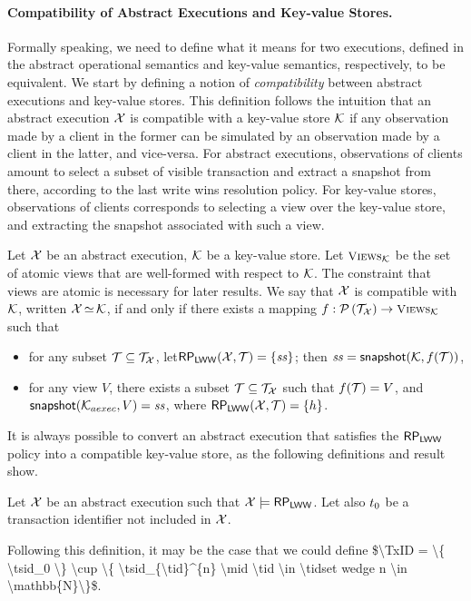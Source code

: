 \paragraph{Compatibility of Abstract Executions and Key-value Stores.}
Formally speaking, we need to define what it means for two executions, defined in the abstract operational semantics and key-value semantics, respectively, 
to be equivalent. We start by defining a notion of \emph{compatibility} between abstract executions and key-value stores. 
This definition follows the intuition that an abstract execution $\mathcal{X}$ is compatible with a key-value store $\mathcal{K}$ if 
any observation made by a client in the former can be simulated by an observation made by a client in the latter, and vice-versa. 
For abstract executions, observations of clients amount to select a subset of visible transaction and extract 
a snapshot from there, according to the last write wins resolution policy. For key-value stores, 
observations of clients corresponds to selecting a view over the key-value store, and extracting the snapshot 
associated with such a view.

\begin{definition}
Let $\mathcal{X}$ be an abstract execution, $\mathcal{K}$ be a key-value store. 
Let $\Views_{\hh}$ be the set of atomic views that are well-formed with 
respect to $\mathcal{K}$.
\ac{The constraint that views are atomic is necessary for later results.}
We say that $\mathcal{X}$ is compatible with $\mathcal{K}$, written 
$\mathcal{X} \mathop{\simeq} \mathcal{K}$, if and only if there exists a  mapping 
$f: \powerset{\T_{\aexec}} \rightarrow \Views_{\hh}$
such that  
\begin{itemize}
\item for any subset $\mathcal{T} \subseteq \mathcal{T}_{\mathcal{X}}$, let$\mathsf{RP}_{\mathsf{LWW}}(\mathcal{X}, \mathcal{T}) = \{\mathit{ss}\}$; 
then $\mathit{ss} = \mathsf{snapshot}(\mathcal{K}, f(\mathcal{T}))$, 
\item for any view $V$, there exists a subset $\mathcal{T} \subseteq \mathcal{T}_{\mathcal{X}}$ 
such that $f(\mathcal{T}) = V$, and $\mathsf{snapshot}(\mathcal{K}_{aexec}, V) = \mathit{ss}$, where 
$\mathsf{RP}_{\mathsf{LWW}}(\mathcal{X}, \mathcal{T}) = \{h\}$.
\end{itemize}
\end{definition}

It is always possible to convert an abstract execution that satisfies the $\mathsf{RP}_{\mathsf{LWW}}$ 
policy into a compatible 
key-value store, as the following definitions and result show.
\begin{definition}
Let $\mathcal{X}$ be an abstract execution such that $\mathcal{X} \models \mathsf{RP}_{\mathsf{LWW}}$. 
Let also $t_0$ be a transaction identifier not included in $\mathcal{X}$. 
\end{definition}
\ac{Following this definition, it may be the case that we could define 
$\TxID = \{ \tsid_0 \} \cup \{ \tsid_{\tid}^{n} \mid \tid \in \tidset wedge n \in \mathbb{N}\}$.
}

